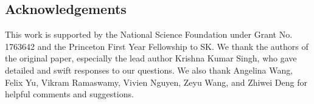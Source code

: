 










\subsection*{Acknowledgements} 
This work is supported by the National Science Foundation under Grant No. 1763642 and the Princeton First Year Fellowship to SK.  We thank the authors of the original paper, especially the lead author Krishna Kumar Singh, who gave detailed and swift responses to our questions. We also thank Angelina Wang, Felix Yu, Vikram Ramaswamy, Vivien Nguyen, Zeyu Wang, and Zhiwei Deng for helpful comments and suggestions.